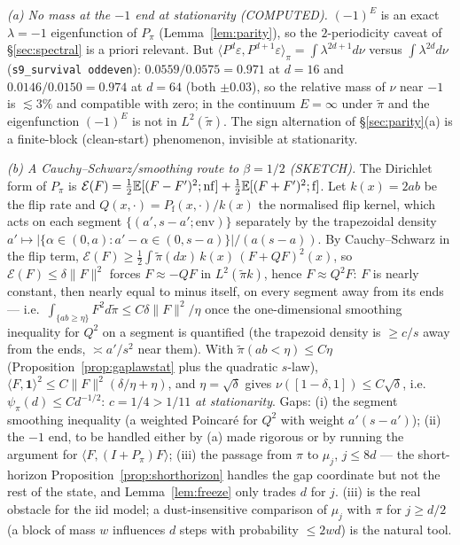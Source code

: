 \emph{(a) No mass at the $-1$ end at stationarity (COMPUTED).}
$(-1)^{E}$ is an exact $\lambda=-1$ eigenfunction of $P_\pi$
(Lemma~\ref{lem:parity}), so the $2$-periodicity caveat of
\S\ref{sec:spectral} is a priori relevant.  But
$\langle P^d\varepsilon,P^{d+1}\varepsilon\rangle_\pi
=\int\lambda^{2d+1}d\nu$ versus $\int\lambda^{2d}d\nu$
(\texttt{s9\_survival oddeven}): $0.0559/0.0575=0.971$ at $d=16$ and
$0.0146/0.0150=0.974$ at $d=64$ (both $\pm0.03$), so the relative
mass of $\nu$ near $-1$ is $\lesssim3\%$ and compatible with zero; in
the continuum $E=\infty$ under $\tilde\pi$ and the eigenfunction
$(-1)^E$ is not in $L^2(\tilde\pi)$.  The sign alternation of
\S\ref{sec:parity}(a) is a finite-block (clean-start) phenomenon,
invisible at stationarity.

\emph{(b) A Cauchy--Schwarz/smoothing route to $\beta=1/2$
(SKETCH).}  The Dirichlet form of $P_\pi$ is
$\mathcal E(F)=\tfrac12\mathbb{E}[(F-F')^2;\mathrm{nf}]+\tfrac12\mathbb{E}[(F+F')^2;\mathrm f]$.
Let $k(x)=2ab$ be the flip rate and $Q(x,\cdot)=P_{\mathrm f}(x,\cdot)/k(x)$
the normalised flip kernel, which acts on each segment
$\{(a',s-a';\mathrm{env})\}$ separately by the trapezoidal density
$a'\mapsto|\{\alpha\in(0,a):a'-\alpha\in(0,s-a)\}|/(a(s-a))$.  By
Cauchy--Schwarz in the flip term,
$\mathcal E(F)\ge\tfrac12\int\tilde\pi(dx)\,k(x)\,(F+QF)^2(x)$, so
$\mathcal E(F)\le\delta\|F\|^2$ forces $F\approx-QF$ in
$L^2(\tilde\pi k)$, hence $F\approx Q^2F$: $F$ is nearly constant,
then nearly equal to minus itself, on every segment away from its
ends --- i.e.\ $\int_{\{ab\ge\eta\}}F^2d\tilde\pi\le C\delta\|F\|^2/\eta$
once the one-dimensional smoothing inequality for $Q^2$ on a segment
is quantified (the trapezoid density is $\ge c/s$ away from the
ends, $\asymp a'/s^2$ near them).  With $\tilde\pi(ab<\eta)\le C\eta$
(Proposition~\ref{prop:gaplawstat} plus the quadratic $s$-law),
$\langle F,\mathbf 1\rangle^2\le C\|F\|^2(\delta/\eta+\eta)$, and
$\eta=\sqrt\delta$ gives $\nu([1-\delta,1])\le C\sqrt\delta$, i.e.\
$\psi_\pi(d)\le Cd^{-1/2}$: $c=1/4>1/11$ \emph{at stationarity}.
Gaps: (i) the segment smoothing inequality (a weighted Poincar\'e
for $Q^2$ with weight $a'(s-a')$); (ii) the $-1$ end, to be handled
either by (a) made rigorous or by running the argument for
$\langle F,(I+P_\pi)F\rangle$; (iii) the passage from $\pi$ to
$\mu_j$, $j\le8d$ --- the short-horizon Proposition~\ref{prop:shorthorizon}
handles the gap coordinate but not the rest of the state, and
Lemma~\ref{lem:freeze} only trades $d$ for $j$.  (iii) is the real
obstacle for the iid model; a dust-insensitive comparison of
$\mu_{j}$ with $\pi$ for $j\ge d/2$ (a block of mass $w$ influences
$d$ steps with probability $\le2wd$) is the natural tool.
